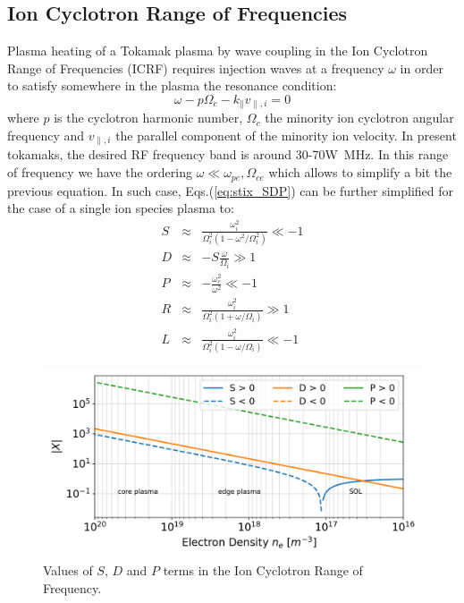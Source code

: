 

\subsection{Ion Cyclotron Range of Frequencies}\label{sec:icrh}
Plasma heating of a Tokamak plasma by wave coupling in the Ion Cyclotron Range of Frequencies (ICRF) requires injection waves at a frequency $\omega$ in order to satisfy somewhere in the plasma the resonance condition:
\begin{equation}
	\omega - p \Omega_c - k_\parallel v_{\parallel,i} = 0
\end{equation}
where $p$ is the cyclotron harmonic number, $\Omega_c$ the minority ion cyclotron angular frequency and $v_{\parallel,i}$ the parallel component of the minority ion velocity. In present tokamaks, the desired RF frequency band is around 30-70W~\si{MHz}. In this range of frequency we have the ordering $\omega \ll \omega_{pe},\Omega_{ce}$ which allows to simplify a bit the previous equation. In such case, Eqs.(\ref{eq:stix_SDP}) can be further simplified for the case of a single ion species plasma to:
\begin{subequations}
	\begin{eqnarray}
		S &\approx& \frac{\omega_{i}^2}{\Omega_{i}^2 \left(1 - \omega^2/\Omega_{i}^2 \right)} \ll -1 \\
		D &\approx& - S \frac{\omega}{\Omega_i} \gg 1 \\
		P &\approx& - \frac{\omega_{e}^2}{\omega^2} \ll -1 \\
		R &\approx& \frac{\omega_i^2}{\Omega_i^2 \left(1+\omega/\Omega_i\right) } \gg 1\\
		L &\approx& \frac{\omega_i^2}{\Omega_i^2 \left(1-\omega/\Omega_i\right) } \ll -1
	\end{eqnarray}
\end{subequations}

\begin{figure}[h]
	\centering
	\includegraphics[width=1.0\linewidth]{figures/chap2/IC_SDP}
	\caption{Values of $S$, $D$ and $P$ terms in the Ion Cyclotron Range of Frequency.}
	\label{fig:icsdp}
\end{figure}



